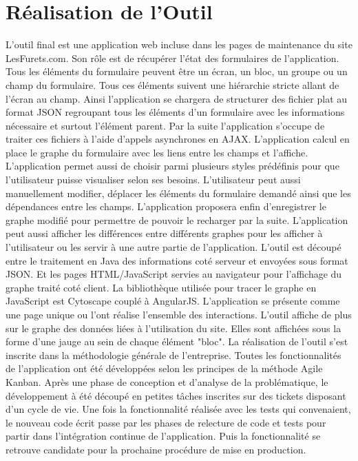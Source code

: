 \documentclass[12pt,a4paper,oldfontcommands]{article}
\begin{document}
\section{Réalisation de l'Outil}
L'outil final est une application web incluse dans les pages de maintenance du site LesFurets.com. Son rôle est de récupérer l'état des formulaires de l'application. Tous les éléments du formulaire peuvent être un écran, un bloc, un groupe ou un champ du formulaire. Tous ces éléments suivent une hiérarchie stricte allant de l'écran au champ.
Ainsi l'application se chargera de structurer des fichier plat au format JSON regroupant tous les éléments d'un formulaire avec les informations nécessaire et surtout l'élément parent.
Par la suite l'application s'occupe de traiter ces fichiers à l'aide d'appels asynchrones en AJAX. L'application calcul en place le graphe du formulaire avec les liens entre les champs et l'affiche. L'application permet aussi de choisir parmi plusieurs styles prédéfinis pour que l'utilisateur puisse visualiser selon ses besoins. L'utilisateur peut aussi manuellement modifier, déplacer les éléments du formulaire demandé ainsi que les dépendances entre les champs. 
L'application proposera enfin d'enregistrer le graphe modifié pour permettre de pouvoir le recharger par la suite. L'application peut aussi afficher les différences entre différents graphes pour les afficher à l'utilisateur ou les servir à une autre partie de l'application. L'outil est découpé entre le traitement en Java des informations coté serveur et envoyées sous format JSON. Et les pages HTML/JavaScript servies au navigateur pour l'affichage du graphe traité coté client. La bibliothèque utilisée pour tracer le graphe en JavaScript est Cytoscape couplé à AngularJS. L'application se présente comme une page unique ou l'ont réalise l'ensemble des interactions. L'outil affiche de plus sur le graphe des données liées à l'utilisation du site. Elles sont affichées sous la forme d'une jauge au sein de chaque élément "bloc".
La réalisation de l'outil s'est inscrite dans la méthodologie générale de l'entreprise. Toutes les fonctionnalités de l'application ont été développées selon les principes de la méthode Agile Kanban. Après une phase de conception et d'analyse de la problématique, le développement à été découpé en petites tâches inscrites sur des tickets disposant d'un cycle de vie. Une fois la fonctionnalité réalisée avec les tests qui convenaient, le nouveau code écrit passe par les phases de relecture de code et tests pour partir dans l'intégration continue de l'application. Puis la fonctionnalité se retrouve candidate pour la prochaine procédure de mise en production.
\end{document}
